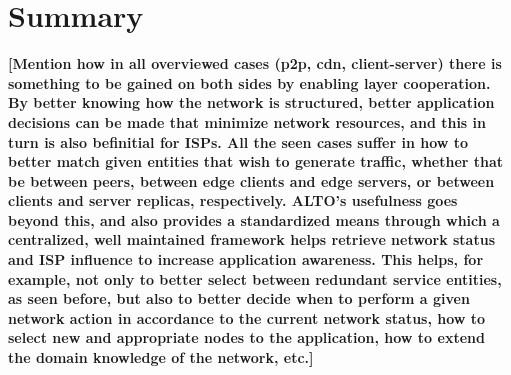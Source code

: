 \section{Summary}


\textbf{[Mention how in all overviewed cases (p2p, cdn, client-server) there is something to be gained on both sides by enabling layer cooperation. By better knowing how the network is structured, better application decisions can be made that minimize network resources, and this in turn is also befinitial for ISPs. All the seen cases suffer in how to better match given entities that wish to generate traffic, whether that be between peers, between edge clients and edge servers, or between clients and server replicas, respectively. ALTO's usefulness goes beyond this, and also provides a standardized means through which a centralized, well maintained  framework helps retrieve network status and ISP influence to increase application awareness. This helps, for example, not only to better select between redundant service entities, as seen before, but also to better decide when to perform a given network action in accordance to the current network status, how to select new and appropriate nodes to the application, how to extend the domain knowledge of the network, etc.]}
